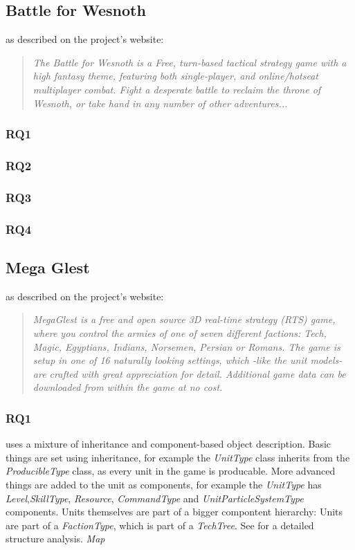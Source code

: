 \subsection{Battle for Wesnoth}
\BOW{} as described on the project's website:
\begin{quote}
\textit{The Battle for Wesnoth is a Free, turn-based tactical strategy game with a high fantasy theme, featuring both
single-player, and online/hotseat multiplayer combat. Fight a desperate battle to reclaim the throne of Wesnoth, or take
hand in any number of other adventures... }
\end{quote}

\subsubsection{RQ1}
\subsubsection{RQ2}
\subsubsection{RQ3}
\subsubsection{RQ4}

\subsection{Mega Glest}
\GLEST{} as described on the project's website:
\begin{quote}
\textit{MegaGlest is a free and open source 3D real-time strategy (RTS) game, where you control the armies of one of
seven different factions: Tech, Magic, Egyptians, Indians, Norsemen, Persian or Romans. The game is setup in one of 16
naturally looking settings, which -like the unit models- are crafted with great appreciation for detail. Additional game
data can be downloaded from within the game at no cost.}
\end{quote}

\subsubsection{RQ1}
\GLEST{} uses a mixture of inheritance and component-based object description. Basic things are set using
inheritance, for example the \textit{UnitType} class inherits from the \textit{ProducibleType} class, as every unit in
the game is producable. More advanced things are added to the unit as components, for example the \textit{UnitType} has
\textit{Level},\textit{SkillType}, \textit{Resource}, \textit{CommandType} and \textit{UnitParticleSystemType}
components. Units themselves are part of a bigger compontent hierarchy: Units are part of a \textit{FactionType}, which
is part of a \textit{TechTree}. See  for a detailed structure analysis.
\textit{Map}

